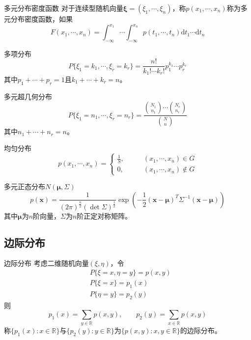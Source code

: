\documentclass[lang = cn, scheme = chinese, thmcnt = section]{elegantbook}
\newcommand{\R}{\mathbb{R}}            %
\begin{document}
\begin{definition}{多元分布密度函数}
	对于连续型随机向量$\boldsymbol{\xi}=(\xi_1,\cdots,\xi_n)$，称$p(x_1,\cdots,x_n)$称为多元分布密度函数，如果%
	$$
	F(x_1,\cdots,x_n)=\int_{-\infty}^{x_1}{\cdots{\int_{-\infty}^{x_n}{p(t_1,\cdots,t_n)\mathrm{d}{t_1}\cdots\mathrm{d}{t_n}}}}
	$$
\end{definition}

\begin{definition}{多项分布}
	$$
	P\{\xi_1=k_1,\cdots,\xi_r=k_r\}=\frac{n!}{k_1!\cdots k_r!}p_1^{k_1}\cdots p_r^{k_r}
	$$
	其中$p_1+\cdots+p_r=1$且$k_1+\cdots+k_r=n$。
\end{definition}

\begin{definition}{多元超几何分布}
	$$
	P\{\xi_1=n_1,\cdots,\xi_r=n_r\}=\frac{{N_1\choose n_1}\cdots{N_r\choose n_r}}{{N\choose n}}
	$$
	其中$n_1+\cdots+n_r=n$。
\end{definition}

\begin{definition}{均匀分布}
	$$
	p(x_1,\cdots,x_n)=\begin{cases}
		\frac{1}{S},&\qquad (x_1,\cdots,x_n)\in G\\
		0,&\qquad (x_1,\cdots,x_n)\notin G
	\end{cases}
	$$
\end{definition}

\begin{definition}{多元正态分布$N(\boldsymbol{\mu},\Sigma)$}
	$$
	p(\boldsymbol{x})=
	\frac{1}{(2\pi)^{\frac{n}{2}}(\det{\Sigma})^{\frac{1}{2}}}
	\exp\left(-\frac{1}{2}(\boldsymbol{x}-\boldsymbol{\mu})^T{\Sigma}^{-1}(\boldsymbol{x}-\boldsymbol{\mu})\right)
	$$
	其中$\boldsymbol{\mu}$为$n$阶向量，$\Sigma$为$n$阶正定对称矩阵。
\end{definition}

\subsection{边际分布}

\begin{definition}{边际分布}
	考虑二维随机向量$(\xi,\eta)$，令
	\begin{align*}
		& P\{\xi=x,\eta=y\}=p(x,y)\\
		& P\{\xi=x\}=p_1(x)\\
		& P\{\eta=y\}=p_2(y)
	\end{align*}
	则%
	$$
	p_1(x)=\sum_{y\in\R}p(x,y),\qquad 
	p_2(y)=\sum_{x\in\R}p(x,y)
	$$
	称$\{ p_1(x):x\in\R \}$与$\{ p_2(y):y\in\R \}$为$\{ p(x,y):x,y\in\R \}$的边际分布。
\end{definition}
\end{document}

